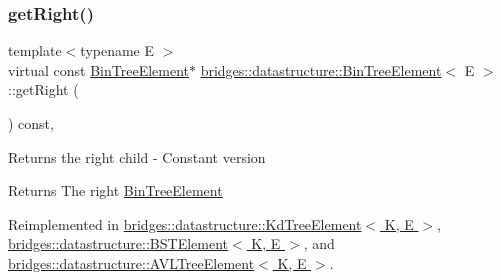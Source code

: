 \mbox{\label{classbridges_1_1datastructure_1_1_bin_tree_element_a795b1696d628b55dafb2bc1aa961843a}} 
\subsubsection{\texorpdfstring{get\+Right()}{getRight()}\hspace{0.1cm}{\footnotesize\ttfamily [2/2]}}
{\footnotesize\ttfamily template$<$typename E $>$ \\
virtual const \hyperlink{classbridges_1_1datastructure_1_1_bin_tree_element}{Bin\+Tree\+Element}$\ast$ \hyperlink{classbridges_1_1datastructure_1_1_bin_tree_element}{bridges\+::datastructure\+::\+Bin\+Tree\+Element}$<$ E $>$\+::get\+Right (\begin{DoxyParamCaption}{ }\end{DoxyParamCaption}) const\hspace{0.3cm}{\ttfamily [inline]}, {\ttfamily [virtual]}}

Returns the right child -\/ Constant version \begin{DoxyReturn}{Returns}
The right \hyperlink{classbridges_1_1datastructure_1_1_bin_tree_element}{Bin\+Tree\+Element} 
\end{DoxyReturn}


Reimplemented in \hyperlink{classbridges_1_1datastructure_1_1_kd_tree_element_ae8d6007d3848b72cbfc11d2e29120781}{bridges\+::datastructure\+::\+Kd\+Tree\+Element$<$ K, E $>$}, \hyperlink{classbridges_1_1datastructure_1_1_b_s_t_element_a012f0eb09c3d62b14c73109e6ded0879}{bridges\+::datastructure\+::\+B\+S\+T\+Element$<$ K, E $>$}, and \hyperlink{classbridges_1_1datastructure_1_1_a_v_l_tree_element_a5a2c4b96b51da1daa3c0426882250acb}{bridges\+::datastructure\+::\+A\+V\+L\+Tree\+Element$<$ K, E $>$}.

\mbox{\label{classbridges_1_1datastructure_1_1_bin_tree_element_a3b3caddd57fd31963b248b4dbcf3df27}} 

